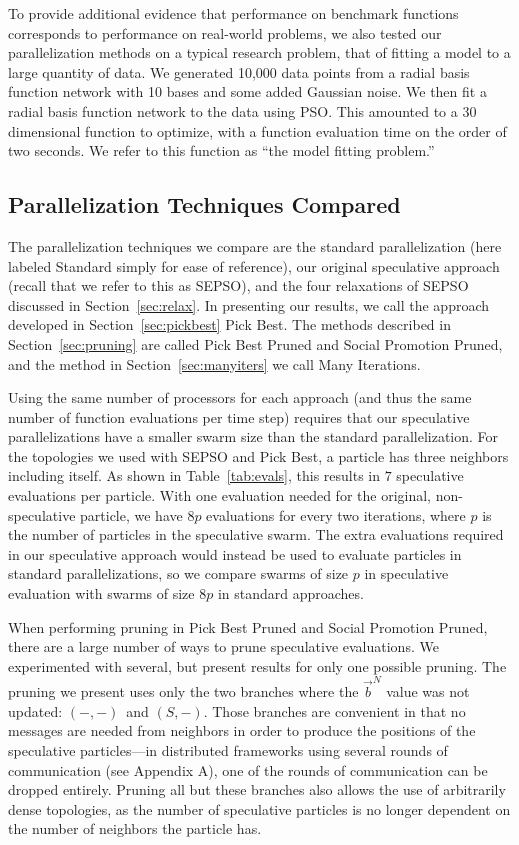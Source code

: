 \documentclass[smallcondensed]{svjour3}
\renewcommand{\sec}[1]{Section~\ref{sec:#1}}
\providecommand{\neigh}{\ensuremath{N}}
\providecommand{\nbest}{\ensuremath{\Vec{b}^\neigh}}
\providecommand{\casexn}{\ensuremath{(S,-)}}
\providecommand{\casepn}{\ensuremath{(-,-)}}
\begin{document}
To provide additional evidence that performance on benchmark functions
corresponds to performance on real-world problems, we also tested our
parallelization methods on a typical research problem, that of fitting a model
to a large quantity of data.  We generated 10,000 data points from a radial
basis function network with 10 bases and some added Gaussian noise.  We then
fit a radial basis function network to the data using PSO.  This amounted to a
30 dimensional function to optimize, with a function evaluation time on the
order of two seconds.  We refer to this function as ``the model fitting
problem.''

\subsection{Parallelization Techniques Compared}

The parallelization techniques we compare are the standard parallelization
(here labeled Standard simply for ease of reference), our original speculative
approach (recall that we refer to this as SEPSO), and the four relaxations of
SEPSO discussed in \sec{relax}.  In presenting our results, we call the
approach developed in \sec{pickbest} Pick Best.  The methods described in
\sec{pruning} are called Pick Best Pruned and Social Promotion Pruned, and the
method in \sec{manyiters} we call Many Iterations.

Using the same number of processors for each approach (and thus the same number
of function evaluations per time step) requires that our speculative
parallelizations have a smaller swarm size than the standard parallelization.
For the topologies we used with SEPSO and Pick Best, a particle has three
neighbors including itself.  As shown in Table~\ref{tab:evals}, this results in
$7$ speculative evaluations per particle.  With one evaluation needed for the
original, non-speculative particle, we have $8p$ evaluations for every two
iterations, where $p$ is the number of particles in the speculative swarm.  The
extra evaluations required in our speculative approach would instead be used to
evaluate particles in standard parallelizations, so we compare swarms of size
$p$ in speculative evaluation with swarms of size $8p$ in standard approaches.

When performing pruning in Pick Best Pruned and Social Promotion Pruned, there
are a large number of ways to prune speculative evaluations.  We experimented
with several, but present results for only one possible pruning.  The pruning
we present uses only the two branches where the $\nbest$ value was not updated:
\casepn\ and \casexn.  Those branches are convenient in that no messages are
needed from neighbors in order to produce the positions of the speculative
particles---in distributed frameworks using several rounds of communication
(see Appendix A), one of the rounds of communication can be dropped entirely.
Pruning all but these branches also allows the use of arbitrarily dense
topologies, as the number of speculative particles is no longer dependent on
the number of neighbors the particle has.
\end{document}

